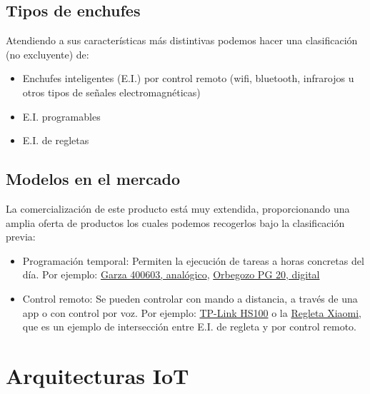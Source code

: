 \documentclass[a4paper,10pt]{article}
\begin{document}
\subsection{Tipos de enchufes}\label{tipos-de-enchufes}

Atendiendo a sus características más distintivas podemos hacer una
clasificación (no excluyente) de:

\begin{itemize}
\item
  Enchufes inteligentes (E.I.) por control remoto (wifi, bluetooth,
  infrarojos u otros tipos de señales electromagnéticas)
\item
  E.I. programables
\item
  E.I. de regletas
\end{itemize}

\subsection{Modelos en el mercado}\label{modelos-en-el-mercado}

La comercialización de este producto está muy extendida, proporcionando
una amplia oferta de productos los cuales podemos recogerlos bajo la
clasificación previa:

\begin{itemize}
\item
  Programación temporal: Permiten la ejecución de tareas a horas
  concretas del día. Por ejemplo:
  \href{https://web.archive.org/web/20191111121153/https://www.amazon.es/Garza-Power-Temporizador-anal\%C3\%B3gico-programaci\%C3\%B3n/dp/B00URUVDW2/}{Garza
  400603, analógico},
  \href{https://web.archive.org/web/20191112121450/https://www.amazon.es/dp/B00ZJ1LQDK}{Orbegozo
  PG 20, digital}
\item
  Control remoto: Se pueden controlar con mando a distancia, a través de
  una app o con control por voz. Por ejemplo:
  \href{https://web.archive.org/web/20191112130933/https://www.amazon.es/dp/B06W586CDZ}{TP-Link
  HS100} o la
  \href{https://web.archive.org/web/20191116174434/https://www.amazon.es/dp/B07DJ2G1CW}{Regleta
  Xiaomi}, que es un ejemplo de intersección entre E.I. de regleta y por
  control remoto.
\end{itemize}

\newpage

\section{Arquitecturas IoT}\label{arquitecturas-iot}
\end{document}
